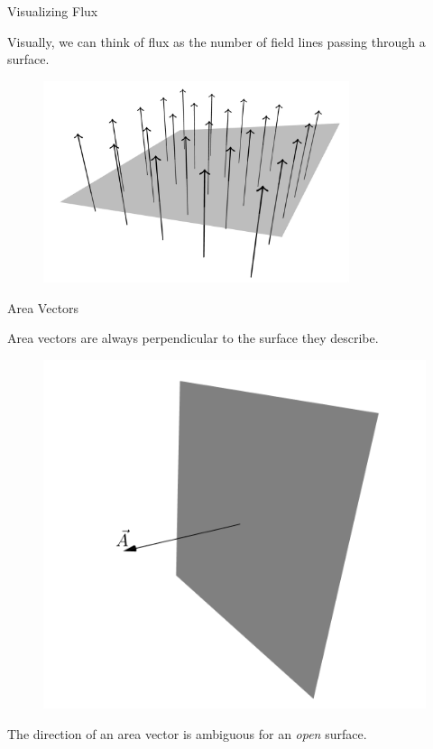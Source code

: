 \documentclass{beamer}
\begin{document}
\begin{frame}{Visualizing Flux}

Visually, we can think of flux as the number of field lines passing through a surface.

\begin{figure}[H]
\centering
\includegraphics[width=0.8\textwidth]{figures/flux.png}
\end{figure}

\end{frame}

\begin{frame}{Area Vectors}

Area vectors are always perpendicular to the surface they describe.

\begin{figure}[H]
\centering
\includegraphics[height=0.5\textwidth]{figures/simple_area_vector.png}
\end{figure}

The direction of an area vector is ambiguous for an \emph{open} surface.

\end{frame}
\end{document}
